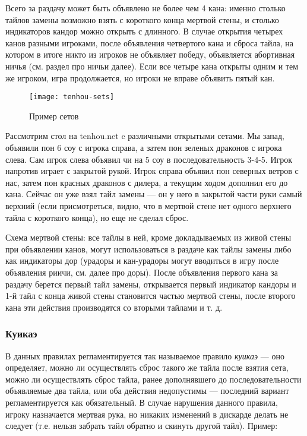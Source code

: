 Всего за раздачу может быть объявлено не более чем 4 кана: именно столько тайлов замены возможно взять с короткого конца мертвой стены, и столько индикаторов кандор можно открыть с длинного. В случае открытия четырех канов разными игроками, после объявления четвертого кана и сброса тайла, на котором в итоге никто из игроков не объявляет победу, объявляется абортивная ничья (см. раздел про ничьи далее). Если все четыре кана открыты одним и тем же игроком, игра продолжается, но игроки не вправе объявить пятый кан.

\begin{figure}[H]
	\centering
	\texttt{[image: tenhou-sets]}
	\caption{Пример сетов}
\end{figure}

Рассмотрим стол на tenhou.net c различными открытыми сетами. Мы запад, объявили пон 6 соу с игрока справа, а затем пон зеленых драконов с игрока слева. Сам игрок слева объявил чи на 5 соу в последовательность 3-4-5. Игрок напротив играет с закрытой рукой. Игрок справа объявил пон северных ветров с нас, затем пон красных драконов с дилера, а текущим ходом дополнил его до кана. Сейчас он уже взял тайл замены --- он у него в закрытой части руки самый верхний (если присмотреться, видно, что в мертвой стене нет одного верхнего тайла с короткого конца), но еще не сделал сброс.

Схема мертвой стены: все тайлы в ней, кроме докладываемых из живой стены при объявлении канов, могут использоваться в раздаче как тайлы замены либо как индикаторы дор (урадоры и кан-урадоры могут вводиться в игру после объявления риичи, см. далее про доры). После объявления первого кана за раздачу берется первый тайл замены, открывается первый индикатор кандоры и 1-й тайл с конца живой стены становится частью мертвой стены, после второго кана эти действия производятся со вторыми тайлами и т. д. 

\subsubsection{Куикаэ}

В данных правилах регламентируется так называемое правило \textit{куикаэ} --- оно определяет, можно ли осуществлять сброс такого же тайла после взятия сета, можно ли осуществлять сброс тайла, ранее дополнявшего до последовательности объявляемые два тайла, или оба действия недопустимы --- последний вариант регламентируется как обязательный. В случае нарушения данного правила, игроку назначается мертвая рука, но никаких изменений в дискарде делать не следует (т.е. нельзя забрать тайл обратно и скинуть другой тайл). Пример:

